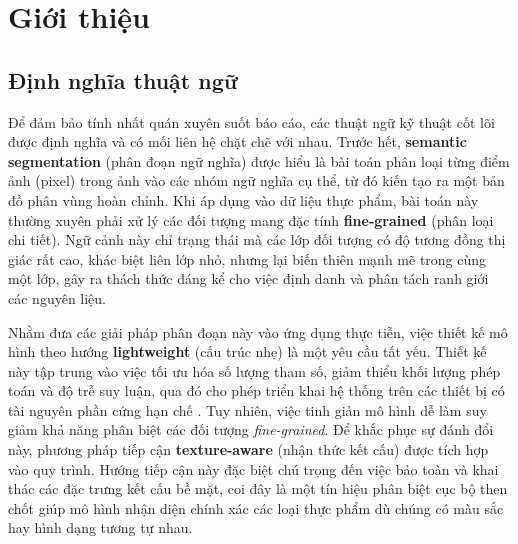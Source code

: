 \section{Giới thiệu}
\subsection{Định nghĩa thuật ngữ}


Để đảm bảo tính nhất quán xuyên suốt báo cáo, các thuật ngữ kỹ thuật cốt lõi được định nghĩa và có mối liên hệ chặt chẽ với nhau. Trước hết, \textbf{semantic segmentation} (phân đoạn ngữ nghĩa) được hiểu là bài toán phân loại từng điểm ảnh (pixel) trong ảnh vào các nhóm ngữ nghĩa cụ thể, từ đó kiến tạo ra một bản đồ phân vùng hoàn chỉnh. Khi áp dụng vào dữ liệu thực phẩm, bài toán này thường xuyên phải xử lý các đối tượng mang đặc tính \textbf{fine-grained} (phân loại chi tiết). Ngữ cảnh này chỉ trạng thái mà các lớp đối tượng có độ tương đồng thị giác rất cao, khác biệt liên lớp nhỏ, nhưng lại biến thiên mạnh mẽ trong cùng một lớp, gây ra thách thức đáng kể cho việc định danh và phân tách ranh giới các nguyên liệu.

Nhằm đưa các giải pháp phân đoạn này vào ứng dụng thực tiễn, việc thiết kế mô hình theo hướng \textbf{lightweight} (cấu trúc nhẹ) là một yêu cầu tất yếu. Thiết kế này tập trung vào việc tối ưu hóa số lượng tham số, giảm thiểu khối lượng phép toán và độ trễ suy luận, qua đó cho phép triển khai hệ thống trên các thiết bị có tài nguyên phần cứng hạn chế \cite{he2015residual, dong2020mobilenetv2}. Tuy nhiên, việc tinh giản mô hình dễ làm suy giảm khả năng phân biệt các đối tượng \emph{fine-grained}. Để khắc phục sự đánh đổi này, phương pháp tiếp cận \textbf{texture-aware} (nhận thức kết cấu) được tích hợp vào quy trình. Hướng tiếp cận này đặc biệt chú trọng đến việc bảo toàn và khai thác các đặc trưng kết cấu bề mặt, coi đây là một tín hiệu phân biệt cục bộ then chốt giúp mô hình nhận diện chính xác các loại thực phẩm dù chúng có màu sắc hay hình dạng tương tự nhau.

